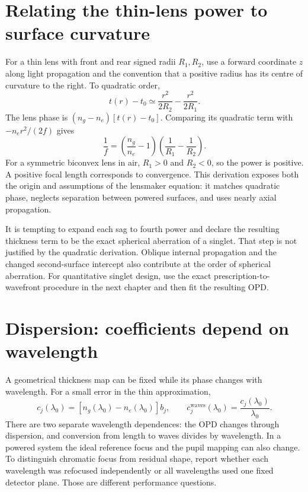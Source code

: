 \section{Relating the thin-lens power to surface curvature}
For a thin lens with front and rear signed radii $R_1,R_2$, use a
forward coordinate $z$ along light propagation and the convention that
a positive radius has its centre of curvature to the right. To
quadratic order,
\begin{equation}
 t(r)-t_0\simeq\frac{r^2}{2R_2}-\frac{r^2}{2R_1}.
\end{equation}
The lens phase is $(n_g-n_e)[t(r)-t_0]$. Comparing its quadratic term
with $-n_er^2/(2f)$ gives
\begin{equation}
 \boxed{\frac1f=\left(\frac{n_g}{n_e}-1\right)
                  \left(\frac1{R_1}-\frac1{R_2}\right).}
 \label{zc:thinlenspower}
\end{equation}
For a symmetric biconvex lens in air, $R_1>0$ and $R_2<0$, so the
power is positive. A positive focal length corresponds to convergence.
This derivation exposes both the origin and assumptions of the
lensmaker equation: it matches quadratic phase, neglects separation
between powered surfaces, and uses nearly axial propagation.

It is tempting to expand each sag to fourth power and declare the
resulting thickness term to be the exact spherical aberration of a
singlet. That step is not justified by the quadratic derivation.
Oblique internal propagation and the changed second-surface intercept
also contribute at the order of spherical aberration. For quantitative
singlet design, use the exact prescription-to-wavefront procedure in
the next chapter and then fit the resulting OPD.

\section{Dispersion: coefficients depend on wavelength}
A geometrical thickness map can be fixed while its phase changes with
wavelength. For a small error in the thin approximation,
\begin{equation}
 c_j(\lambda_0)=[n_g(\lambda_0)-n_e(\lambda_0)]b_j,
 \qquad
 c_j^{\mathrm{waves}}(\lambda_0)=\frac{c_j(\lambda_0)}{\lambda_0}.
\end{equation}
There are two separate wavelength dependences: the OPD changes through
dispersion, and conversion from length to waves divides by wavelength.
In a powered system the ideal reference focus and the pupil mapping
can also change. To distinguish chromatic focus from residual shape,
report whether each wavelength was refocused independently or all
wavelengths used one fixed detector plane. Those are different
performance questions.

